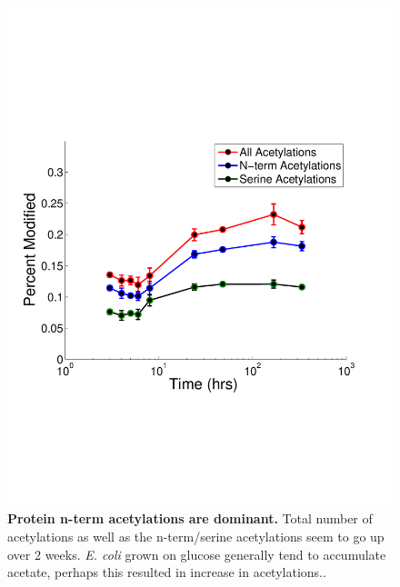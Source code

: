 \documentclass[12pt]{article}
\begin{document}
\clearpage
\begin{figure}[p]
\centerline{\includegraphics[width=5in]{Figures/Acetylation_AAs.pdf}}
\caption{\label{fig:Acet}\textbf{Protein n-term acetylations are dominant.} Total number of acetylations as well as the n-term/serine acetylations seem to go up over 2 weeks. \emph{E. coli} grown on glucose generally tend to accumulate acetate, perhaps this resulted in increase in acetylations..}
\end{figure}
\end{document}
